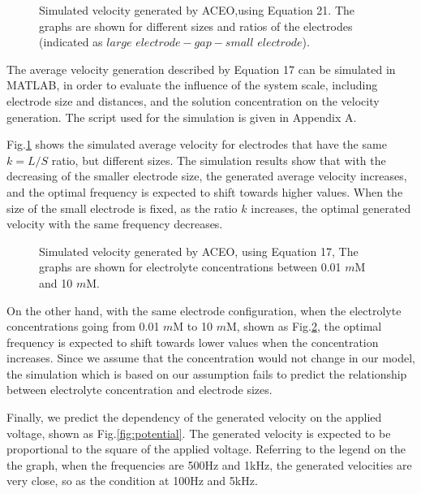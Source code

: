 \documentclass[journal,svgnames,twocolumn,x11names]{IEEEtran}
\begin{document}
\begin{figure}[ht]
	\centering
	\hspace{0.3in}
	\caption{Simulated velocity generated by ACEO,using Equation 21. The graphs are shown for different sizes and ratios of the electrodes (indicated as $large$ $electrode-gap-small$ $electrode$).}
	\label{fig:size}
	\vspace{-0.3cm}
\end{figure}

The average velocity generation described by Equation 17 can be simulated in MATLAB, in order to evaluate the influence of the system scale, including electrode size and distances, and the solution concentration on the velocity generation. The script used for the simulation is given in Appendix A.

Fig.\ref{fig:size} shows the simulated average velocity for electrodes that have the same $k = L/S$ ratio, but different sizes. The simulation results show that with the decreasing of the smaller electrode size, the generated average velocity increases, and the optimal frequency is expected to shift towards higher values. When the size of the small electrode is fixed, as the ratio $k$ increases, the optimal generated velocity with the same frequency decreases.
\begin{figure}[htbp]
    \centering
    
    \setlength{\abovecaptionskip}{-0.2cm} %
    \caption{Simulated velocity generated by ACEO, using Equation 17, The graphs are shown for electrolyte concentrations between 0.01 $m$M and 10 $m$M.}
    \label{fig:concentration}
    \vspace{-0.5cm}
\end{figure}

On the other hand, with the same electrode configuration, when the electrolyte concentrations going from 0.01 $m$M to 10 $m$M, shown as Fig.\ref{fig:concentration}, the optimal frequency is expected to shift towards lower values when the concentration increases. Since we assume that the concentration would not change in our model, the simulation  which is based on our assumption fails to predict the relationship between electrolyte concentration and electrode sizes.

Finally, we predict the dependency of the generated velocity on the applied voltage, shown as Fig.\ref{fig:potential}. The generated velocity is expected to be proportional to the square of the applied voltage. Referring to the legend on the the graph, when the frequencies are 500Hz and 1kHz, the generated velocities are very close, so as the condition at 100Hz and 5kHz. 
\end{document}
